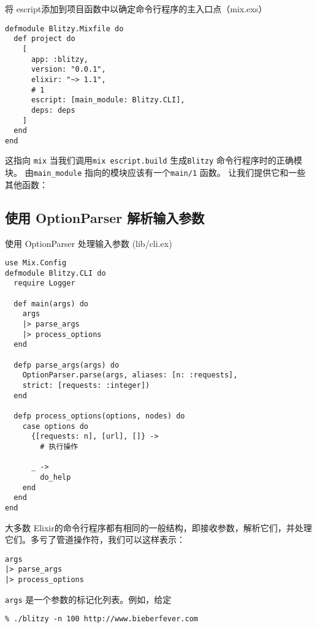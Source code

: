 \begin{code}{将 escript添加到项目函数中以确定命令行程序的主入口点（mix.exs）}
\begin{verbatim}
defmodule Blitzy.Mixfile do
  def project do
    [
      app: :blitzy,
      version: "0.0.1",
      elixir: "~> 1.1",
      # 1
      escript: [main_module: Blitzy.CLI],
      deps: deps
    ]
  end
end
\end{verbatim}
\label{lst:escript}
\end{code}

这指向 \texttt{mix} 当我们调用\texttt{mix escript.build} 生成\texttt{Blitzy} 命令行程序时的正确模块。
由\texttt{main\_module} 指向的模块应该有一个\texttt{main/1} 函数。
让我们提供它和一些其他函数：

\subsection{使用 OptionParser 解析输入参数}

\begin{code}{使用 OptionParser 处理输入参数 (lib/cli.ex)}

\begin{verbatim}
use Mix.Config
defmodule Blitzy.CLI do
  require Logger

  def main(args) do
    args
    |> parse_args
    |> process_options
  end

  defp parse_args(args) do
    OptionParser.parse(args, aliases: [n: :requests],
    strict: [requests: :integer])
  end

  defp process_options(options, nodes) do
    case options do
      {[requests: n], [url], []} ->
        # 执行操作

      _ ->
        do_help
    end
  end
end
\end{verbatim}
\end{code}

大多数 Elixir的命令行程序都有相同的一般结构，即接收参数，解析它们，并处理它们。多亏了管道操作符，我们可以这样表示：

\begin{code}{}
\begin{verbatim}
args
|> parse_args
|> process_options
\end{verbatim}
\end{code}

\texttt{args} 是一个参数的标记化列表。例如，给定

\begin{code}{}
\begin{verbatim}
% ./blitzy -n 100 http://www.bieberfever.com
\end{verbatim}
\end{code}

